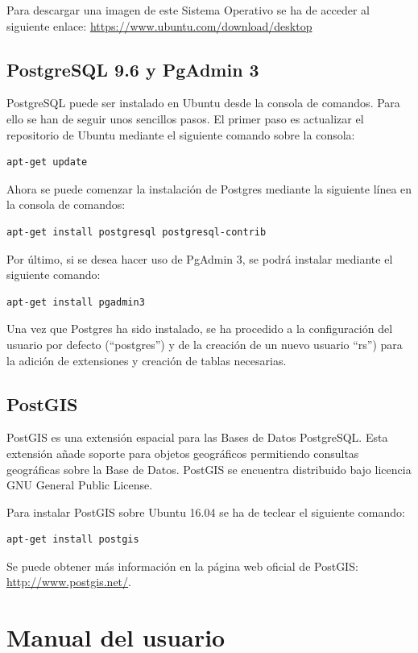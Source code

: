 Para descargar una imagen de este Sistema Operativo se ha de acceder al siguiente enlace: \url{https://www.ubuntu.com/download/desktop}


\subsection{PostgreSQL 9.6 y PgAdmin 3}
PostgreSQL puede ser instalado en Ubuntu desde la consola de comandos. Para ello se han de seguir unos sencillos pasos.
El primer paso es actualizar el repositorio de Ubuntu mediante el siguiente comando sobre la consola:
\begin{lstlisting}
apt-get update
\end{lstlisting}
Ahora se puede comenzar la instalación de Postgres mediante la siguiente línea en la consola de comandos:
\begin{lstlisting}
apt-get install postgresql postgresql-contrib
\end{lstlisting}

Por último, si se desea hacer uso de PgAdmin 3, se podrá instalar mediante el siguiente comando:
\begin{lstlisting}
apt-get install pgadmin3
\end{lstlisting}

Una vez que Postgres ha sido instalado, se ha procedido a la configuración del usuario por defecto (``postgres'') y de la creación de un nuevo usuario ``rs'') para la adición de extensiones y creación de tablas necesarias.

\subsection{PostGIS}
PostGIS es una extensión espacial para las Bases de Datos PostgreSQL. Esta extensión añade soporte para objetos geográficos permitiendo consultas geográficas sobre la Base de Datos.
PostGIS se encuentra distribuido bajo licencia GNU General Public License.

Para instalar PostGIS sobre Ubuntu 16.04 se ha de teclear el siguiente comando:
\begin{lstlisting}
apt-get install postgis
\end{lstlisting}

Se puede obtener más información en la página web oficial de PostGIS: \url{http://www.postgis.net/}.

\section{Manual del usuario}


